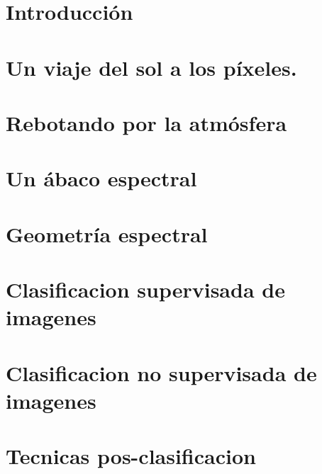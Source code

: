 \documentclass[a4paper]{article}
\begin{document}
\section*{Introducción}
\label{sec:intro}
\newpage
\section{Un viaje del sol a los p\'ixeles.}
\label{viaje}

\newpage

\section{Rebotando por la atm\'osfera}
\label{rebotando}

\newpage

\section{Un \'abaco espectral}
\label{abaco}

\newpage

\section{Geometr\'ia espectral}
\label{rotaciones}

\newpage

\section{Clasificacion supervisada de imagenes}
\label{educando}

\newpage

\section{Clasificacion no supervisada de imagenes}
\label{otrolado}

\newpage

\section{Tecnicas pos-clasificacion}
\label{pos}

\newpage
\end{document}

